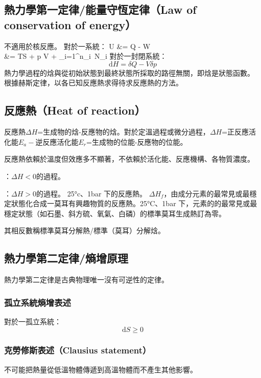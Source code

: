 \documentclass[a4paper,12pt]{report}
\begin{document}
\subsection{熱力學第一定律/能量守恆定律（Law of conservation of energy）}
不適用於核反應。
對於一系統：
\bma
{}U &= \delta Q - \delta W\\
&= TS + p \delta V + \sum _{i=1}^{n}\mu _{i}\, N_i
\eam
{}
對於一封閉系統：
\[\mathrm{d}H = \delta Q - V\delta p \]
熱力學過程的焓與從初始狀態到最終狀態所採取的路徑無關，即焓是狀態函數。
根據赫斯定律，以各已知反應熱求得待求反應熱的方法。
\subsection{反應熱（Heat of reaction）}
反應熱$\Delta H$=生成物的焓-反應物的焓。對於定溫過程或微分過程，$\Delta H$=正反應活化能$E_a-$逆反應活化能$E_r$=生成物的位能-反應物的位能。

反應熱依賴於溫度但效應多不顯著，不依賴於活化能、反應機構、各物質濃度。

\bit
\item {}：$\Delta H<0$的過程。
\item {}：$\Delta H>0$的過程。
\eit
{}
25°c、1bar 下的反應熱。
$\Delta H_f$，由成分元素的最常見或最穩定狀態化合成一莫耳有興趣物質的反應熱。25°C、1bar 下，元素的的最常見或最穩定狀態（如石墨、斜方硫、氧氣、白磷）的標準莫耳生成熱訂為零。

其相反數稱標準莫耳分解熱/標準（莫耳）分解焓。
\subsection{熱力學第二定律/熵增原理}
熱力學第二定律是古典物理唯一沒有可逆性的定律。
\subsubsection{孤立系統熵增表述}
對於一孤立系統：
\[\mathrm{d}S \geq 0\]
\subsubsection{克勞修斯表述（Clausius statement）}
不可能把熱量從低溫物體傳遞到高溫物體而不產生其他影響。
\end{document}
